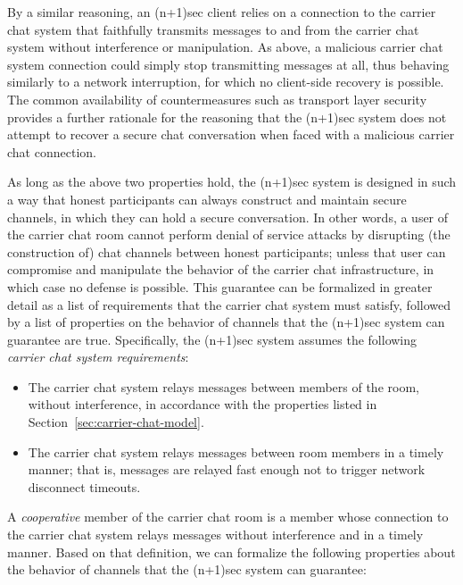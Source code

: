 \documentclass{article}
\begin{document}
By a similar reasoning, an (n+1)sec client relies on a connection to the carrier chat system that faithfully transmits messages to and from the carrier chat system without interference or manipulation.
As above, a malicious carrier chat system connection could simply stop transmitting messages at all, thus behaving similarly to a network interruption, for which no client-side recovery is possible.
The common availability of countermeasures such as transport layer security provides a further rationale for the reasoning that the (n+1)sec system does not attempt to recover a secure chat conversation when faced with a malicious carrier chat connection.

As long as the above two properties hold, the (n+1)sec system is designed in such a way that honest participants can always construct and maintain secure channels, in which they can hold a secure conversation.
In other words, a user of the carrier chat room cannot perform denial of service attacks by disrupting (the construction of) chat channels between honest participants; unless that user can compromise and manipulate the behavior of the carrier chat infrastructure, in which case no defense is possible.
This guarantee can be formalized in greater detail as a list of requirements that the carrier chat system must satisfy, followed by a list of properties on the behavior of channels that the (n+1)sec system can guarantee are true.
Specifically, the (n+1)sec system assumes the following \emph{carrier chat system requirements}:

\begin{itemize}
\item The carrier chat system relays messages between members of the room, without interference, in accordance with the properties listed in Section~\ref{sec:carrier-chat-model}.
\item The carrier chat system relays messages between room members in a timely manner; that is, messages are relayed fast enough not to trigger network disconnect timeouts.
\end{itemize}

A \emph{cooperative} member of the carrier chat room is a member whose connection to the carrier chat system relays messages without interference and in a timely manner.
Based on that definition, we can formalize the following properties about the behavior of channels that the (n+1)sec system can guarantee:
\end{document}
